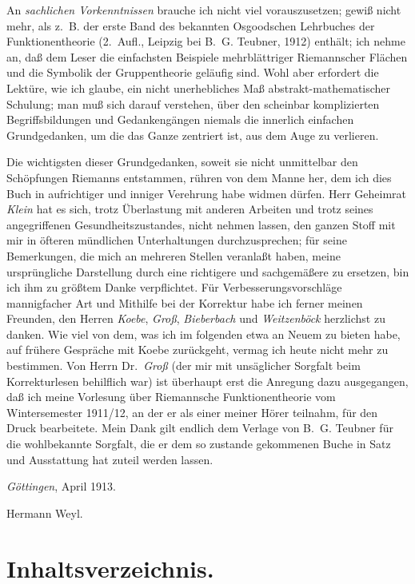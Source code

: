 \documentclass{article}
\begin{document}
An \emph{sachlichen Vorkenntnissen} brauche ich nicht viel vorauszusetzen; gewiß nicht mehr, als z.~B. der erste Band des bekannten Osgoodschen Lehrbuches der Funktionentheorie (2.~Aufl., Leipzig bei B.~G. Teubner, 1912) enthält; ich nehme an, daß dem Leser die einfachsten Beispiele mehrblättriger Riemannscher Flächen und die Symbolik der Gruppentheorie geläufig sind. Wohl aber erfordert die Lektüre, wie ich glaube, ein nicht unerhebliches Maß abstrakt-mathematischer Schulung; man muß sich darauf verstehen, über den scheinbar komplizierten Begriffsbildungen und Gedankengängen niemals die innerlich einfachen Grundgedanken, um die das Ganze zentriert ist, aus dem Auge zu verlieren.

Die wichtigsten dieser Grundgedanken, soweit sie nicht unmittelbar den Schöpfungen Riemanns entstammen, rühren von dem Manne her, dem ich dies Buch in aufrichtiger und inniger Verehrung habe widmen dürfen. Herr Geheimrat \emph{Klein} hat es sich, trotz Überlastung mit anderen Arbeiten und trotz seines angegriffenen Gesundheitszustandes, nicht nehmen lassen, den ganzen Stoff mit mir in öfteren mündlichen Unterhaltungen durchzusprechen; für seine Bemerkungen, die mich an mehreren Stellen veranlaßt haben, meine ursprüngliche Darstellung durch eine richtigere und sachgemäßere zu ersetzen, bin ich ihm zu größtem Danke verpflichtet. Für Verbesserungsvorschläge mannigfacher Art und Mithilfe bei der Korrektur habe ich ferner meinen Freunden, den Herren \emph{Koebe}, \emph{Groß}, \emph{Bieberbach} und \emph{Weitzenböck} herzlichst zu danken. Wie viel von dem, was ich im folgenden etwa an Neuem zu bieten habe, auf frühere Gespräche mit Koebe zurückgeht, vermag ich heute nicht mehr zu bestimmen. Von Herrn Dr.~\emph{Groß} (der mir mit unsäglicher Sorgfalt beim Korrekturlesen behilflich war) ist überhaupt erst die Anregung dazu ausgegangen, daß ich meine Vorlesung über Riemannsche Funktionentheorie vom Wintersemester 1911/12, an der er als einer meiner Hörer teilnahm, für den Druck bearbeitete. Mein Dank gilt endlich dem Verlage von B.~G. Teubner für die wohlbekannte Sorgfalt, die er dem so zustande gekommenen Buche in Satz und Ausstattung hat zuteil werden lassen.

\emph{Göttingen}, April 1913.

Hermann Weyl.


\section*{Inhaltsverzeichnis.}
\end{document}
